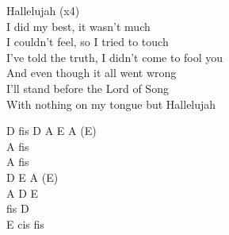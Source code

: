 \documentclass[a5paper, 10pt]{book}
\begin{document}
\begin{minipage}[t]{0.8\textwidth}

\hspace*{6mm}Hallelujah (x4)\\

I did my best, it wasn't much\\
I couldn't feel, so I tried to touch\\
I've told the truth, I didn't come to fool you\\
And even though it all went wrong\\
I'll stand before the Lord of Song\\
With nothing on my tongue but Hallelujah\\
\end{minipage}
\begin{minipage}[t]{0.2\textwidth}

D fis D A E A (E)\\

  A fis\\
 A fis\\
 D E A (E)\\
 A D E\\
 fis D\\
 E cis fis\\
\end{minipage}

\end{document}
